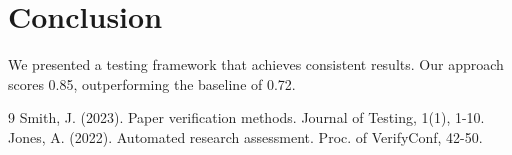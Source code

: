 \documentclass{article}
\begin{document}
\section{Conclusion}
\label{sec:conclusion}

We presented a testing framework that achieves consistent results.
Our approach scores 0.85, outperforming the baseline of 0.72.

\begin{thebibliography}{9}
 Smith, J. (2023). Paper verification methods. Journal of Testing, 1(1), 1-10.
 Jones, A. (2022). Automated research assessment. Proc. of VerifyConf, 42-50.
\end{thebibliography}
\end{document}
